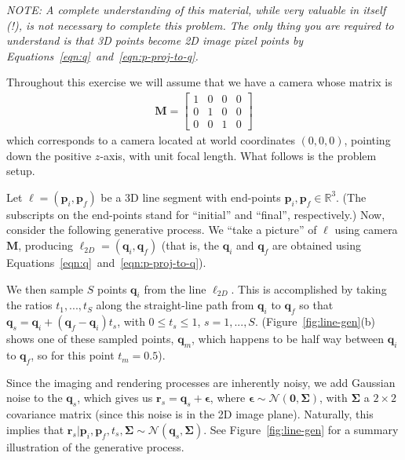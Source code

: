 \documentclass[10pt]{article}
\begin{document}
{\em NOTE: A complete understanding of this material, while very valuable in itself (!), is not necessary to complete this problem.  The only thing you are required to understand is that 3D points become 2D image pixel points by Equations~\ref{eqn:q}~and~\ref{eqn:p-proj-to-q}.}

Throughout this exercise we will assume that we have a camera whose matrix is
\begin{eqnarray*}
\mathbf{M} = 
\begin{bmatrix}
1 & 0 & 0 & 0 \\
0 & 1 & 0 & 0 \\
0 & 0 & 1 & 0
\end{bmatrix}
\end{eqnarray*}
which corresponds to a camera located at world coordinates $(0,0,0)$, pointing down the positive $z$-axis, with unit focal length.  What follows is the problem setup.

Let $\boldsymbol{\ell} = (\mathbf{p}_i, \mathbf{p}_f)$ be a 3D line segment with end-points $\mathbf{p}_i, \mathbf{p}_f \in \mathbb{R}^3$.  (The subscripts on the end-points stand for ``initial'' and ``final'', respectively.)  Now, consider the following generative process.  We ``take a picture'' of $\boldsymbol{\ell}$ using camera $\mathbf{M}$, producing $\boldsymbol{\ell}_{2D} = (\mathbf{q}_{i}, \mathbf{q}_{f})$ (that is, the $\mathbf{q}_{i}$ and $\mathbf{q}_{f}$ are obtained using Equations~\ref{eqn:q}~and~\ref{eqn:p-proj-to-q}).  

We then sample $S$ points $\mathbf{q}_i$ from the line $\boldsymbol{\ell}_{2D}$.  This is accomplished by taking the ratios $t_1, ..., t_S$ along the straight-line path from $\mathbf{q}_{i}$ to $\mathbf{q}_{f}$ so that $\mathbf{q}_s = \mathbf{q}_i + (\mathbf{q}_f - \mathbf{q}_i)t_s$, with $0 \leq t_s \leq 1$, $s = 1, ..., S$. (Figure~\ref{fig:line-gen}(b) shows one of these sampled points, $\mathbf{q}_m$, which happens to be half way between $\mathbf{q}_{i}$ to $\mathbf{q}_{f}$, so for this point $t_m=0.5$).  

Since the imaging and rendering processes are inherently noisy, we add Gaussian noise to the $\mathbf{q}_s$, which gives us $\mathbf{r}_s = \mathbf{q}_s + \boldsymbol{\epsilon}$, where $\boldsymbol{\epsilon} \sim \mathcal{N}(\mathbf{0}, \boldsymbol{\Sigma})$, with $\boldsymbol{\Sigma}$ a $2 \times 2$ covariance matrix (since this noise is in the 2D image plane).  Naturally, this implies that $\mathbf{r}_s | \mathbf{p}_i, \mathbf{p}_f, t_s, \boldsymbol{\Sigma} \sim \mathcal{N}(\mathbf{q}_s, \boldsymbol{\Sigma})$.  See Figure~\ref{fig:line-gen} for a summary illustration of the generative process. 
\end{document}
